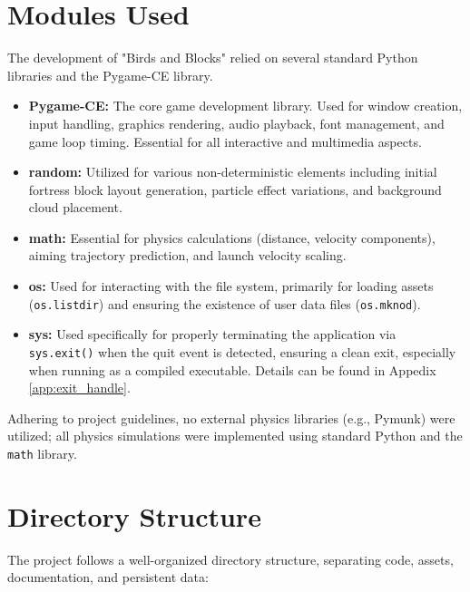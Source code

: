 \documentclass[11pt, a4paper]{article}
\begin{document}
\vspace{2cm}

\section{Modules Used}

The development of "Birds and Blocks" relied on several standard Python libraries and the Pygame-CE library.

\begin{itemize}
    \item \textbf{Pygame-CE:} The core game development library. Used for window creation, input handling, graphics rendering, audio playback, font management, and game loop timing. Essential for all interactive and multimedia aspects.

    \item \textbf{random:} Utilized for various non-deterministic elements including initial fortress block layout generation, particle effect variations, and background cloud placement.
    
    \item \textbf{math:} Essential for physics calculations (distance, velocity components), aiming trajectory prediction, and launch velocity scaling.
    
    \item \textbf{os:} Used for interacting with the file system, primarily for loading assets (\texttt{os.listdir}) and ensuring the existence of user data files (\texttt{os.mknod}).
    
    \item \textbf{sys:} Used specifically for properly terminating the application via \texttt{sys.exit()} when the quit event is detected, ensuring a clean exit, especially when running as a compiled executable. Details can be found in Appedix \ref{app:exit_handle}.

\end{itemize}

Adhering to project guidelines, no external physics libraries (e.g., Pymunk) were utilized; all physics simulations were implemented using standard Python and the \texttt{math} library.

\newpage

\section{Directory Structure}

The project follows a well-organized directory structure, separating code, assets, documentation, and persistent data:
\end{document}
